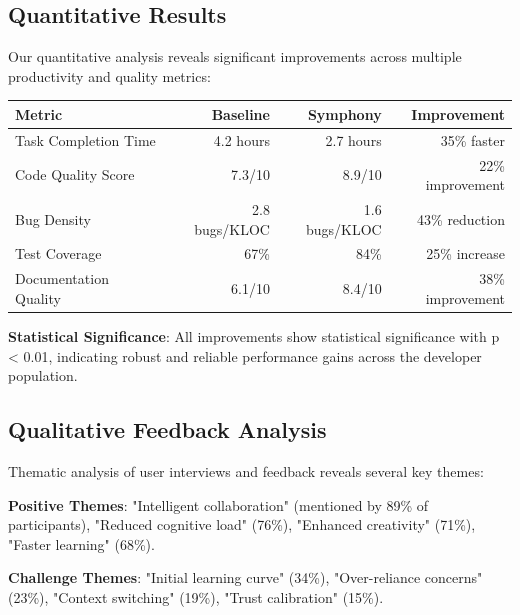 \subsection*{Quantitative Results}

Our quantitative analysis reveals significant improvements across multiple productivity and quality metrics:

\begin{center}
\begin{tabular}{@{}lrrr@{}}
\toprule
\textbf{Metric} & \textbf{Baseline} & \textbf{Symphony} & \textbf{Improvement} \\
\midrule
Task Completion Time & 4.2 hours & 2.7 hours & 35\% faster \\
Code Quality Score & 7.3/10 & 8.9/10 & 22\% improvement \\
Bug Density & 2.8 bugs/KLOC & 1.6 bugs/KLOC & 43\% reduction \\
Test Coverage & 67\% & 84\% & 25\% increase \\
Documentation Quality & 6.1/10 & 8.4/10 & 38\% improvement \\
\bottomrule
\end{tabular}
\end{center}

\textbf{Statistical Significance}: All improvements show statistical significance with p < 0.01, indicating robust and reliable performance gains across the developer population.

\subsection*{Qualitative Feedback Analysis}

Thematic analysis of user interviews and feedback reveals several key themes:

\begin{infobox}[title=User Satisfaction Themes]
\textbf{Positive Themes}: "Intelligent collaboration" (mentioned by 89\% of participants), "Reduced cognitive load" (76\%), "Enhanced creativity" (71\%), "Faster learning" (68\%).

\textbf{Challenge Themes}: "Initial learning curve" (34\%), "Over-reliance concerns" (23\%), "Context switching" (19\%), "Trust calibration" (15\%).
\end{infobox}

